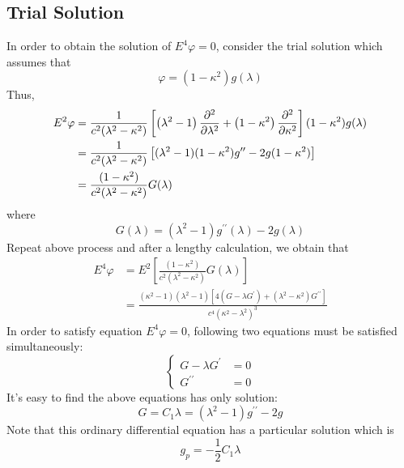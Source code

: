 \documentclass[fontsize=11pt, %
                             paper=a4, %
                             twoside, %
                             captions=tableheading,
                             index=totoc,
                             hyperref]{labbook}
\begin{document}
\begin{addmargin}[4cm]{0cm}
\section{Trial Solution}
In order to obtain the solution of $E^4\varphi=0$, consider the trial solution which assumes that
\begin{equation}
\varphi=(1-\kappa^2)g(\lambda)
\end{equation}
Thus,
\begin{equation}
\begin{aligned}
E^2\varphi&=\frac{1}{c^2(\lambda^2-\kappa^2)}\left[\left(\lambda^2-1\right)\frac{\partial^2 }{\partial \lambda^2}+\left(1-\kappa^2\right)\frac{\partial^2 }{\partial \kappa^2}\right](1-\kappa^2)g(\lambda)\\
&=\frac{1}{c^2(\lambda^2-\kappa^2)}\left[(\lambda^2-1)(1-\kappa^2)g^{\prime\prime}-2g(1-\kappa^2)\right]\\
&=\frac{(1-\kappa^2)}{c^2(\lambda^2-\kappa^2)}G(\lambda)
\end{aligned}
\end{equation}
where
\begin{equation}
G(\lambda)=(\lambda^2-1)g^{\prime\prime}(\lambda)-2g(\lambda)
\end{equation}
Repeat above process and after a lengthy calculation, we obtain that
\begin{equation}
\begin{aligned}
E^4\varphi&=E^2\left[\frac{(1-\kappa^2)}{c^2(\lambda^2-\kappa^2)}G(\lambda)\right]\\
&=\frac{(\kappa^2-1)(\lambda^2-1)\left[4(G-\lambda G^\prime)+(\lambda^2-\kappa^2)G^{\prime\prime}\right]}{c^4(\kappa^2-\lambda^2)^3}
\end{aligned}
\end{equation}
In order to satisfy equation $E^4\varphi=0$, following two equations must be satisfied simultaneously:
\begin{equation}
\left\{
\begin{aligned}
G-\lambda G^\prime&=0\\
G^{\prime\prime}&=0
\end{aligned}
\right.
\end{equation}
It's easy to find the above equations has only solution:
\begin{equation}\label{eqn-lambdapart}
G=C_1\lambda=(\lambda^2-1)g^{\prime\prime}-2g
\end{equation}
Note that this ordinary differential equation has a particular solution which is
\begin{equation}
g_{p}=-\frac{1}{2}C_1\lambda

\end{equation}
\end{addmargin}
\end{document}
